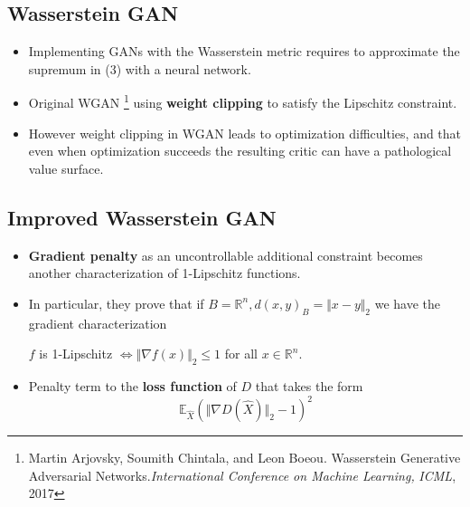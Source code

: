 \documentclass[landscape,headrule,footrule]{foils}
\begin{document}
\subsection{Wasserstein GAN}
\tableofcontents
\begin{frame}
\begin{flushleft}
\begin{itemize}
\item Implementing GANs with the Wasserstein metric requires to approximate the supremum in (3) with a neural network.
\\
\item Original WGAN \footnote{Martin Arjovsky, Soumith Chintala, and Leon Boeou. Wasserstein Generative Adversarial Networks.\textit{International Conference on Machine Learning,} \textsl{ICML}, 2017} using \textbf{weight clipping} to satisfy the Lipschitz constraint.
\\
\item However weight clipping in WGAN leads to optimization difficulties, and that even when optimization succeeds the resulting critic can have a pathological value surface.
\end{itemize}
\end{flushleft}
\end{frame}

\subsection{Improved Wasserstein GAN}
\tableofcontents
\begin{frame}
\begin{flushleft}
\begin{itemize}
\item \textbf{Gradient penalty} as an uncontrollable additional constraint becomes another characterization of 1-Lipschitz functions.
\\
\item In particular, they prove that if $B=\mathbb{R}^n, d(x,y)_B=\Vert x-y \Vert_2$ we have the gradient characterization
\begin{center}
	$f$ is 1-Lipschitz $\Longleftrightarrow \Vert \nabla f(x) \Vert_2 \leq 1$ for all $x\in \mathbb{R}^n$. \\
\end{center}	
\item Penalty term to the \textbf{loss function} of $D$ that takes the form
\begin{equation}
\mathbb{E}_{\widehat{X}} \left( \Vert \nabla D(\widehat{X}) \Vert_2 -1 \right)^2
\end{equation}
\end{itemize}
\end{flushleft}
\end{frame}
\end{document}
